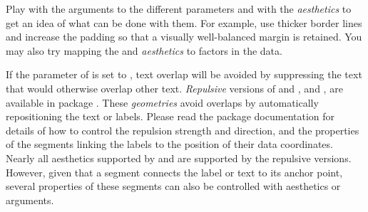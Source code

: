 \documentclass[krantz2]{krantz}\usepackage{knitr}
\begin{document}
\begin{playground}
Play with the arguments to the different parameters and with the \emph{aesthetics} to get an idea of what can be done with them. For example, use thicker border lines and increase the padding so that a visually well-balanced margin is retained. You may also try mapping the  and  \emph{aesthetics} to factors in the data.
\end{playground}

If the parameter  of  is set to , text overlap will be avoided by suppressing the text that would otherwise overlap other text.  \emph{Repulsive} versions of  and ,  and ,  are available in package . These \emph{geometries} avoid overlaps by automatically repositioning the text or labels. Please read the package documentation for details of how to control the repulsion strength and direction, and the properties of the segments linking the labels to the position of their data coordinates. Nearly all aesthetics supported by  and  are supported by the repulsive versions. However, given that a segment connects the label or text to its anchor point, several properties of these segments can also be controlled with aesthetics or arguments.
\end{document}
